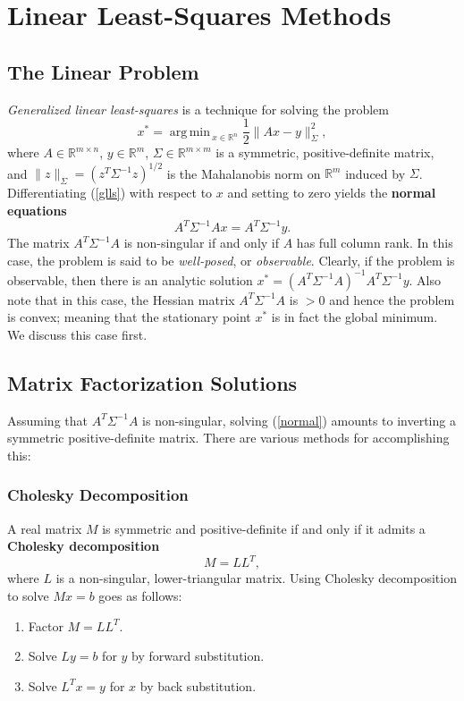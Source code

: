 \documentclass[reqno]{amsart}
\DeclareMathOperator*{\argmin}{arg\,min\,}
\numberwithin{equation}{section}
\begin{document}
\section{Linear Least-Squares Methods}
\subsection{The Linear Problem}

\emph{Generalized linear least-squares} is a technique for solving the problem
\begin{equation}
    x^* = \argmin_{x \in \mathbb R^n} \frac12 \| Ax - y\|_\Sigma^2,
\label{glls}
\end{equation}
where $A \in \mathbb R^{m \times n}$, $y \in \mathbb R^m$, $\Sigma \in \mathbb R^{m \times m}$
is a symmetric, positive-definite matrix, and $\| z \|_\Sigma = (z^T \Sigma^{-1} z)^{1/2}$ is the
Mahalanobis norm on $\mathbb R^m$ induced by $\Sigma$. Differentiating (\ref{glls}) with respect
to $x$ and setting to zero yields the \textbf{normal equations}
\begin{equation}
    A^T \Sigma^{-1} A x = A^T \Sigma^{-1} y.
\label{normal}
\end{equation}
The matrix $A^T \Sigma^{-1} A$ is non-singular if and only if $A$ has full column rank. In this
case, the problem is said to be \emph{well-posed}, or \emph{observable}.
Clearly, if the problem is observable, then there is an analytic solution
$x^* = (A^T \Sigma^{-1} A)^{-1} A^T \Sigma^{-1} y$. Also note that in this case, the Hessian
matrix $A^T \Sigma^{-1} A$ is $>0$ and hence the problem is convex; meaning that the stationary
point $x^*$ is in fact the global minimum. We discuss this case first.

\subsection{Matrix Factorization Solutions}
Assuming that $A^T \Sigma^{-1} A$ is non-singular, solving (\ref{normal}) amounts to inverting a
symmetric positive-definite matrix. There are various methods for accomplishing this:
\subsubsection{Cholesky Decomposition}
A real matrix $M$ is symmetric and positive-definite if and only if it admits
a \textbf{Cholesky decomposition}
$$
M = LL^T,
$$
where $L$ is a non-singular, lower-triangular matrix. Using Cholesky decomposition to solve
$Mx = b$ goes as follows:
\begin{enumerate}
    \item Factor $M = LL^T$.
    \item Solve $Ly = b$ for $y$ by forward substitution.
    \item Solve $L^Tx = y$ for $x$ by back substitution.
\end{enumerate}
\end{document}

